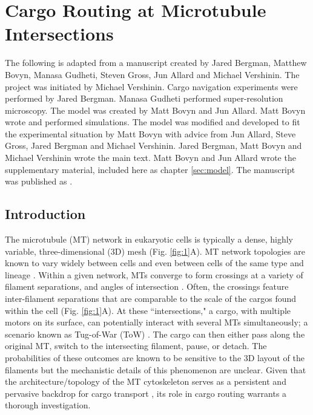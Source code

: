 \chapter{Cargo Routing at Microtubule Intersections} \label{sec:maintext}

The following is adapted from a manuscript created by Jared Bergman, Matthew Bovyn, Manasa Gudheti, Steven Gross, Jun Allard and Michael Vershinin. The project was initiated by Michael Vershinin. Cargo navigation experiments were performed by Jared Bergman. Manasa Gudheti performed super-resolution microscopy. The model was created by Matt Bovyn and Jun Allard. Matt Bovyn wrote and performed simulations. The model was modified and developed to fit the experimental situation by Matt Bovyn with advice from Jun Allard, Steve Gross, Jared Bergman and Michael Vershinin. Jared Bergman, Matt Bovyn and Michael Vershinin wrote the main text. Matt Bovyn  and Jun Allard wrote the supplementary material, included here as chapter \ref{sec:model}. The manuscript was published as \cite{Bergman2018}.

\section{Introduction}

The microtubule (MT) network in eukaryotic cells is typically a dense, highly variable, three-dimensional (3D) mesh (Fig. \ref{fig:1}A). MT network topologies are known to vary widely between cells \cite{Schnorrenberg2016} and even between cells of the same type and lineage \cite{Dong2015}. Within a given network, MTs converge to form crossings at a variety of filament separations, and angles of intersection \cite{Huang2008}. Often, the crossings feature inter-filament separations that are comparable to the scale of the cargos found within the cell (Fig. \ref{fig:1}A). At these ``intersections," a cargo, with multiple motors on its surface, can potentially interact with several MTs simultaneously; a scenario known as Tug-of-War (ToW) \cite{Muller2008,Osunbayo2015}. The cargo can then either pass along the original MT, switch to the intersecting filament, pause, or detach. The probabilities of these outcomes are known to be sensitive to the 3D layout of the filaments \cite{Balint2013,Ross2008,Erickson2013} but the mechanistic details of this phenomenon are unclear. Given that the architecture/topology of the MT cytoskeleton serves as a persistent and pervasive backdrop for cargo transport \cite{Verdeny-Vilanova2017}, its role in cargo routing warrants a thorough investigation.

